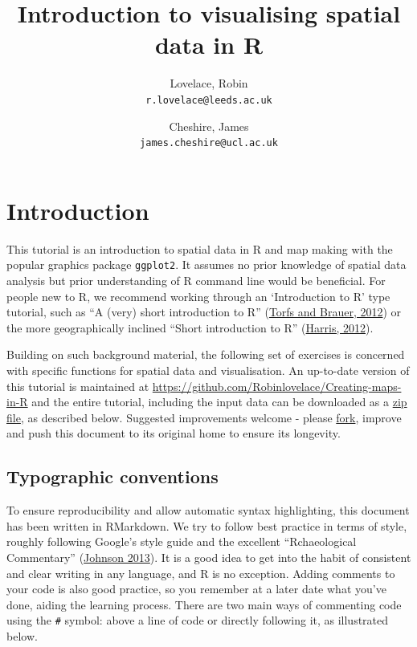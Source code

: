 \documentclass[]{article}
\author{Lovelace, Robin\\
\texttt{r.lovelace@leeds.ac.uk}
\and
Cheshire, James\\
\texttt{james.cheshire@ucl.ac.uk}
}
\title{Introduction to visualising spatial data in R}
\begin{document}
\maketitle

\section{Introduction}

This tutorial is an introduction to spatial data in R and map making
with the popular graphics package \texttt{ggplot2}. It assumes no prior
knowledge of spatial data analysis but prior understanding of R command
line would be beneficial. For people new to R, we recommend working
through an `Introduction to R' type tutorial, such as ``A (very) short
introduction to R''
(\href{http://cran.r-project.org/doc/contrib/Torfs+Brauer-Short-R-Intro.pdf}{Torfs
and Brauer, 2012}) or the more geographically inclined ``Short
introduction to R''
(\href{http://www.social-statistics.org/wp-content/uploads/2012/12/intro\_to\_R1.pdf}{Harris,
2012}).

Building on such background material, the following set of exercises is
concerned with specific functions for spatial data and visualisation. An
up-to-date version of this tutorial is maintained at
\href{https://github.com/Robinlovelace/Creating-maps-in-R/blob/master/intro-spatial-rl.pdf}{https://github.com/Robinlovelace/Creating-maps-in-R}
and the entire tutorial, including the input data can be downloaded as a
\href{https://github.com/Robinlovelace/Creating-maps-in-R/archive/master.zip}{zip
file}, as described below. Suggested improvements welcome - please
\href{https://help.github.com/articles/fork-a-repo}{fork}, improve and
push this document to its original home to ensure its longevity.

\subsection{Typographic conventions}

To ensure reproducibility and allow automatic syntax highlighting, this
document has been written in RMarkdown. We try to follow best practice
in terms of style, roughly following Google's style guide and the
excellent ``Rchaeological Commentary''
(\href{http://cran.r-project.org/web/packages/rockchalk/vignettes/Rstyle.pdf}{Johnson
2013}). It is a good idea to get into the habit of consistent and clear
writing in any language, and R is no exception. Adding comments to your
code is also good practice, so you remember at a later date what you've
done, aiding the learning process. There are two main ways of commenting
code using the \texttt{\#} symbol: above a line of code or directly
following it, as illustrated below.
\end{document}
